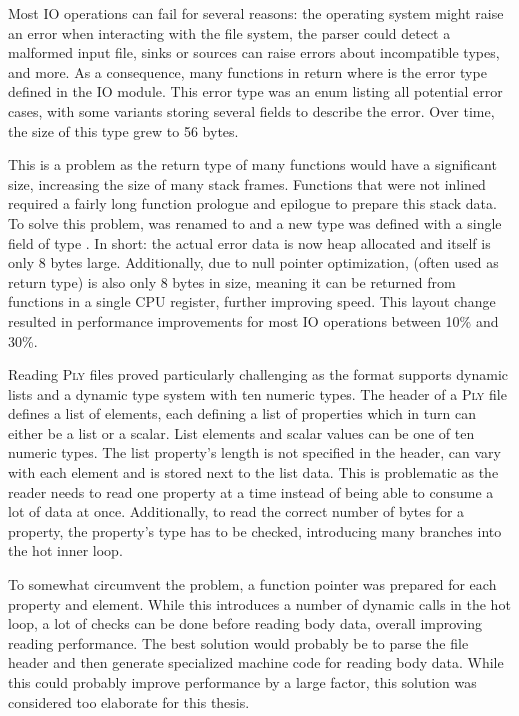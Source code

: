 Most IO operations can fail for several reasons: the operating system might raise an error when interacting with the file system, the parser could detect a malformed input file, sinks or sources can raise errors about incompatible types, and more.
As a consequence, many functions in  return  where  is the error type defined in the IO module.
This error type was an enum listing all potential error cases, with some variants storing several fields to describe the error.
Over time, the size of this type grew to 56 bytes.

This is a problem as the return type of many functions would have a significant size, increasing the size of many stack frames.
Functions that were not inlined required a fairly long function prologue and epilogue to prepare this stack data.
To solve this problem,  was renamed to  and a new type  was defined with a single field of type .
In short: the actual error data is now heap allocated and  itself is only 8 bytes large.
Additionally, due to null pointer optimization,  (often used as return type) is also only 8 bytes in size, meaning it can be returned from functions in a single CPU register, further improving speed.
This layout change resulted in performance improvements for most IO operations between 10\% and 30\%.

Reading \textsc{Ply} files proved particularly challenging as the format supports dynamic lists and a dynamic type system with ten numeric types.
The header of a \textsc{Ply} file defines a list of elements, each defining a list of properties which in turn can either be a list or a scalar.
List elements and scalar values can be one of ten numeric types.
The list property's length is not specified in the header, can vary with each element and is stored next to the list data.
This is problematic as the reader needs to read one property at a time instead of being able to consume a lot of data at once.
Additionally, to read the correct number of bytes for a property, the property's type has to be checked, introducing many branches into the hot inner loop.

To somewhat circumvent the problem, a function pointer was prepared for each property and element.
While this introduces a number of dynamic calls in the hot loop, a lot of checks can be done before reading body data, overall improving reading performance.
The best solution would probably be to parse the file header and then generate specialized machine code for reading body data.
While this could probably improve performance by a large factor, this solution was considered too elaborate for this thesis.


